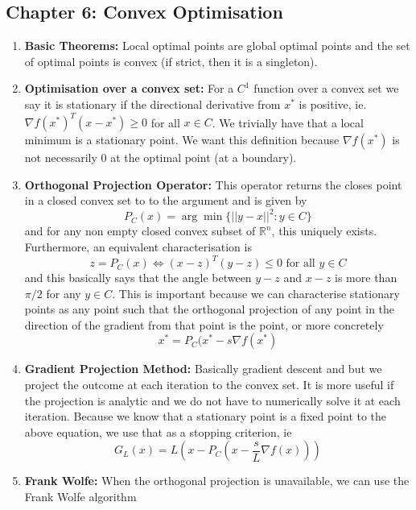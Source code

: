\documentclass{article}
\begin{document}
\subsection*{Chapter 6: Convex Optimisation}
\begin{enumerate}
    \item \textbf{Basic Theorems:} Local optimal points are global optimal points and the set of optimal points is convex (if strict, then it is a singleton).
    \item \textbf{Optimisation over a convex set:} For a \(C^1\) function over a convex set we say it is stationary if the directional derivative from \(x^*\) is positive, ie. \(\nabla f(x^*)^T(x - x^*) \geq 0\) for all \(x \in C\). We trivially have that a local minimum is a stationary point. We want this definition because \(\nabla f(x^*)\) is not necessarily 0 at the optimal point (at a boundary). 
    \item \textbf{Orthogonal Projection Operator:} This operator returns the closes point in a closed convex set to to the argument and is given by
    \[
    P_C(x) = \arg \min \{||y -x||^2:y \in C\}
    \]
    and for any non empty closed convex subset of \(\mathbb{R}^n\), this uniquely exists. Furthermore, an equivalent characterisation is
    \[
    z = P_C(x) \iff (x - z)^T(y - z) \leq 0 \text{ for all } y \in C
    \]
    and this basically says that the angle between \(y - z\) and \(x - z\) is more than \(\pi/2\) for any \(y \in C\). This is important because we can characterise stationary points as any point such that the orthogonal projection of any point in the direction of the gradient from that point is the point, or more concretely
    \[
    x^* = P_C(x^* - s\nabla f(x^*)
    \]
    \item \textbf{Gradient Projection Method:} Basically gradient descent and but we project the outcome at each iteration to the convex set. It is more useful if the projection is analytic and we do not have to numerically solve it at each iteration. Because we know that a stationary point is a fixed point to the above equation, we use that as a stopping criterion, ie
    \[
    G_L(x)= L\left(x - P_C\left(x - \frac{s}{L}\nabla f(x)\right)\right)
    \]
    \item \textbf{Frank Wolfe:} When the orthogonal projection is unavailable, we can use the Frank Wolfe algorithm
    
\end{enumerate}
\end{document}
